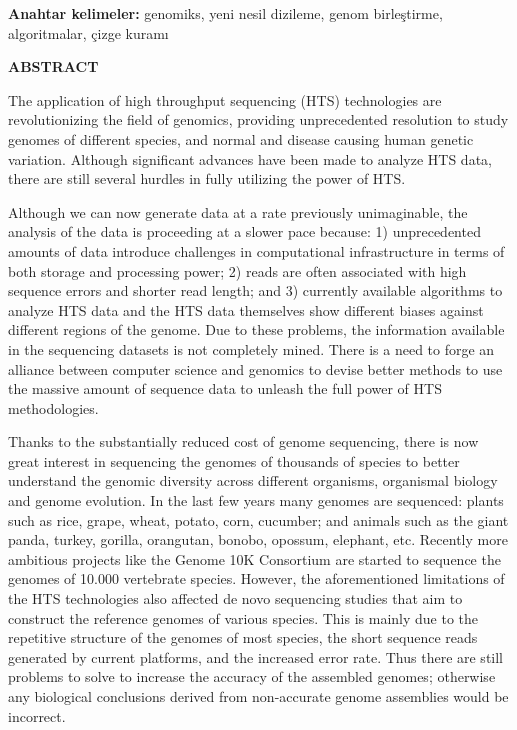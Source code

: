 \documentclass[11pt]{article}
\begin{document}
{\bf Anahtar kelimeler:} genomiks, yeni nesil dizileme, genom birleştirme, algoritmalar, çizge kuramı

\newpage
\phantom{ss}
\vspace{-2.5cm}


\begin{center}
{\bf \Large ABSTRACT}
\end{center}
\noindent
The application of high throughput sequencing (HTS) technologies are revolutionizing the field of genomics, providing unprecedented resolution to study genomes of different species, and normal and disease causing human genetic variation. Although significant advances have been made to analyze HTS data, there are still several hurdles in fully utilizing the power of HTS. 

Although we can now generate data at a rate previously unimaginable, the analysis of the data is proceeding at a slower pace because: 1) unprecedented amounts of data introduce challenges in computational infrastructure in terms of both storage and processing power; 2) reads are often associated with high sequence errors and shorter read length; and 3) currently available algorithms to analyze HTS data and the HTS data themselves show different biases against different regions of the genome. Due to these problems, the information available in the sequencing datasets is not completely mined. There is a need to forge an alliance between computer science and genomics to devise better methods to use the massive amount of sequence data to unleash the full power of HTS methodologies.

Thanks to the substantially reduced cost of genome sequencing, there is now great interest in sequencing the genomes of thousands of species to better understand the genomic diversity across different organisms, organismal biology and genome evolution. In the last few years many genomes are sequenced: plants such as rice, grape, wheat, potato, corn, cucumber; and animals such as the giant panda, turkey, gorilla, orangutan, bonobo, opossum, elephant, etc. Recently more ambitious projects like the Genome 10K Consortium are started to sequence the genomes of 10.000 vertebrate species. However, the aforementioned limitations of the HTS technologies also affected de novo sequencing studies that aim to construct the reference genomes of various species. This is mainly due to the repetitive structure of the genomes of most species, the short sequence reads generated by current platforms, and the increased error rate. Thus there are still problems to solve to increase the accuracy of the assembled genomes; otherwise any biological conclusions derived from non-accurate genome assemblies would be incorrect.
\end{document}
